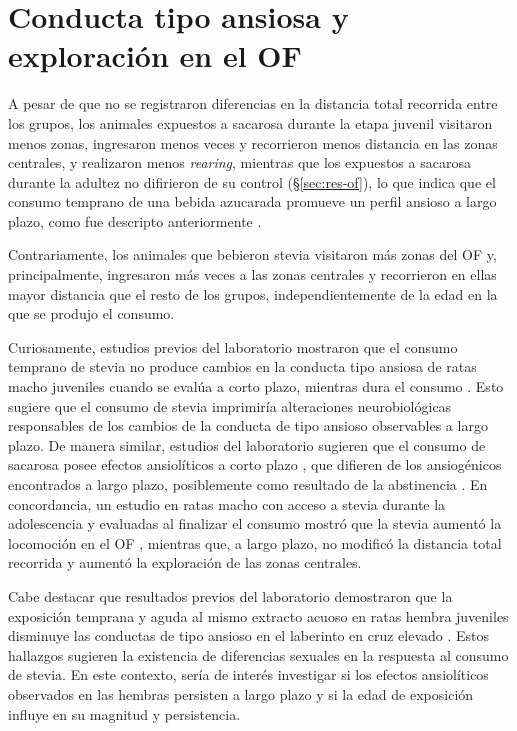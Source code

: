 \section{Conducta tipo ansiosa y exploración en el OF}\label{sec:disc-of}

A pesar de que no se registraron diferencias en la distancia total recorrida entre los grupos, los animales expuestos a sacarosa durante la etapa juvenil visitaron menos zonas, ingresaron menos veces y recorrieron menos distancia en las zonas centrales, y realizaron menos \textit{rearing}, mientras que los expuestos a sacarosa durante la adultez no difirieron de su control (\S\ref{sec:res-of}), lo que indica que el consumo temprano de una bebida azucarada promueve un perfil ansioso a largo plazo, como fue descripto anteriormente \cite{kruse2019sucrose}.

Contrariamente, los animales que bebieron stevia visitaron más zonas del OF y, principalmente, ingresaron más veces a las zonas centrales y recorrieron en ellas mayor distancia que el resto de los grupos, independientemente de la edad en la que se produjo el consumo.

Curiosamente, estudios previos del laboratorio mostraron que el consumo temprano de stevia no produce cambios en la conducta tipo ansiosa de ratas macho juveniles cuando se evalúa a corto plazo, mientras dura el consumo \cite{coirini2023stevia,marchena2025stevia}. Esto sugiere que el consumo de stevia imprimiría alteraciones neurobiológicas responsables de los cambios de la conducta de tipo ansioso observables a largo plazo. De manera similar, estudios del laboratorio sugieren que el consumo de sacarosa posee efectos ansiolíticos a corto plazo \cite{rey2024metformin}, que difieren de los ansiogénicos encontrados a largo plazo, posiblemente como resultado de la abstinencia \cite{kruse2019sucrose}. En concordancia, un estudio en ratas macho con acceso a stevia durante la adolescencia y evaluadas al finalizar el consumo mostró que la stevia aumentó la locomoción en el OF \cite{rico2024stevia}, mientras que, a largo plazo, no modificó la distancia total recorrida y aumentó la exploración de las zonas centrales.

Cabe destacar que resultados previos del laboratorio demostraron que la exposición temprana y aguda al mismo extracto acuoso en ratas hembra juveniles disminuye las conductas de tipo ansioso en el laberinto en cruz elevado \cite{kruse2025stevia}. Estos hallazgos sugieren la existencia de diferencias sexuales en la respuesta al consumo de stevia. En este contexto, sería de interés investigar si los efectos ansiolíticos observados en las hembras persisten a largo plazo y si la edad de exposición influye en su magnitud y persistencia.

